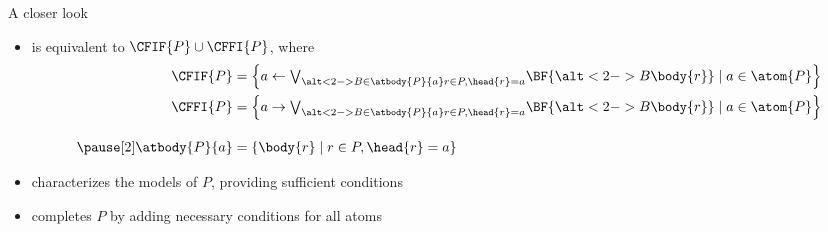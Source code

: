 \begin{frame}{A closer look}
  \bigskip
  \begin{itemize}
  \item {} is equivalent to $\CFIF{P}\cup\CFFI{P}$,
    where
    \begin{align*}
      \CFIF{P}
      & =
        \left\{a \leftarrow \textstyle{\bigvee_{\alt<2->{B\in\atbody{P}{a}}{r\in P, \head{r} = a}}}    \BF{\alt<2->{B}{\body{r}}}        \mid a\in\atom{P}\right\}
      \\
      \CFFI{P}
      & =
        \left\{a \rightarrow \textstyle{\bigvee_{\alt<2->{B\in\atbody{P}{a}}{r\in P, \head{r} = a}}}    \BF{\alt<2->{B}{\body{r}}}        \mid a\in\atom{P}\right\}
      \\[10pt]\pause[2]
      \atbody{P}{a}
      & =
        \left\{\body{r} \mid r\in P, \head{r}=a\right\}
    \end{align*}
    \smallskip
  \item<only@3->  characterizes the models of $P$,
    providing sufficient conditions
    \smallskip
  \item<only@3->  completes $P$ by adding necessary conditions for all atoms
  \end{itemize}
\end{frame}

